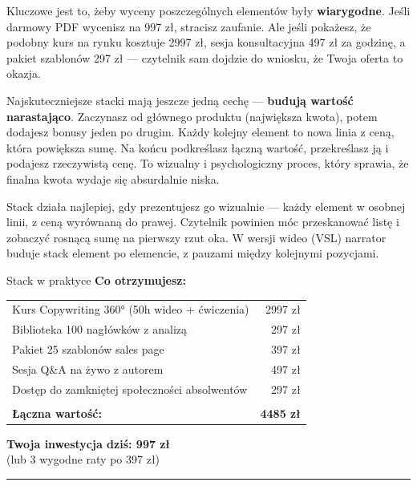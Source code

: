 \documentclass[
  12pt,
  a4paper,
  twoside,
  openright,
  12pt,
  DIV=12,
  BCOR=12mm]{scrbook}
\newcommand{\decoline}{%
  \begin{center}
    \textcolor{bordergray}{\rule{0.3\textwidth}{0.5pt}}
  \end{center}
}
\begin{document}
Kluczowe jest to, żeby wyceny poszczególnych elementów były
\textbf{wiarygodne}. Jeśli darmowy PDF wycenisz na 997 zł, stracisz
zaufanie. Ale jeśli pokażesz, że podobny kurs na rynku kosztuje 2997 zł,
sesja konsultacyjna 497 zł za godzinę, a pakiet szablonów 297 zł ---
czytelnik sam dojdzie do wniosku, że Twoja oferta to okazja.

Najskuteczniejsze stacki mają jeszcze jedną cechę --- \textbf{budują
wartość narastająco}. Zaczynasz od głównego produktu (największa kwota),
potem dodajesz bonusy jeden po drugim. Każdy kolejny element to nowa
linia z ceną, która powiększa sumę. Na końcu podkreślasz łączną wartość,
przekreślasz ją i podajesz rzeczywistą cenę. To wizualny i
psychologiczny proces, który sprawia, że finalna kwota wydaje się
absurdalnie niska.

\begin{wskazowka}
Stack działa najlepiej, gdy prezentujesz go wizualnie --- każdy element w osobnej linii, z ceną wyrównaną do prawej. Czytelnik powinien móc przeskanować listę i zobaczyć rosnącą sumę na pierwszy rzut oka. W wersji wideo (VSL) narrator buduje stack element po elemencie, z pauzami między kolejnymi pozycjami.
\end{wskazowka}

\begin{przyklad}{Stack w praktyce}
\textbf{Co otrzymujesz:}

\begin{tabular}{@{}p{}r@{}}
Kurs Copywriting 360° (50h wideo + ćwiczenia) & 2997 zł \\
Biblioteka 100 nagłówków z analizą & 297 zł \\
Pakiet 25 szablonów sales page & 397 zł \\
Sesja Q\&A na żywo z autorem & 497 zł \\
Dostęp do zamkniętej społeczności absolwentów & 297 zł \\[6pt]
\hline\\[-6pt]
\textbf{Łączna wartość:} & \textbf{4485 zł} \\[6pt]
\end{tabular}

\begin{center}
\Large\textbf{Twoja inwestycja dziś: 997 zł}\\[2pt]
\normalsize(lub 3 wygodne raty po 397 zł)
\end{center}
\end{przyklad}

\decoline
\end{document}
